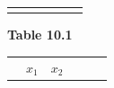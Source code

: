 {{\begin{center}
\begin{tabular}[t]{|l|l|l|l|l|l|}
         &
         &
         &
         &
     \tabularnewline\cline{1-1}\cline{2-2}\cline{3-3}\cline{4-4}\cline{5-5}\cline{6-6}
    \end{tabular}
      \end{center}
    \begin{center}{\small\bfseries Table 10.1}\end{center}
          }{ %
        \begin{center}
      \label{m39213*id189899}
    \noindent
      \tablelasttail{}
      \begin{xtabular}[t]{|l|l|l|l|l|l|}\hline
         &
                  ${x}_{1}$
                 &
                  ${x}_{2}$
                 &

\end{xtabular}
\end{center}}}
